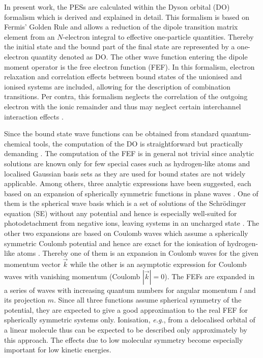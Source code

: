 In present work, the PESs are calculated within the Dyson orbital (DO) formalism which is derived and explained in detail.
This formalism is based on Fermis' Golden Rule \cite{fgr} and allows a reduction of the dipole transition matrix element from an $N$-electron integral to effective one-particle quantities. %
Thereby the initial state and the bound part of the final state are represented by a one-electron quantity denoted as DO.
The other wave function entering the dipole moment operator is the free electron function (FEF).
In this formalism, electron relaxation and correlation effects between bound states of the unionised and ionised systems are included, allowing for the description of combination transitions.
Per contra, this formalism neglects the correlation of the outgoing electron with the ionic remainder and thus may neglect certain interchannel interaction effects \cite{LiSonntag}.

Since the bound state wave functions can be obtained from standard quantum-chemical tools, the computation of the DO is straightforward but practically demanding \cite{MAgg}.
The computation of the FEF is in general not trivial since analytic solutions are known only for few special cases such as hydrogen-like atoms \cite{Lifschitz} and localised Gaussian basis sets as they are used for bound states are not widely applicable.
Among others, three analytic expressions have been suggested, each based on an expansion of spherically symmetric functions in plane waves \cite{ezDyson}.
One of them is the spherical wave basis which is a set of solutions of the Schr\"odinger equation (SE) without any potential and hence is especially well-suited for photodetachment from negative ions, leaving systems in an uncharged state \cite{ezDyson, DO_TDDFT}.
The other two expansions are based on Coulomb waves which assume a spherically symmetric Coulomb potential and hence are exact for the ionisation of hydrogen-like atoms \cite{Lifschitz}.
Thereby one of them is an expansion in Coulomb waves for the given momentum vector $\vec{k}$ while the other is an asymptotic expression for Coulomb waves with vanishing momentum (Coulomb $|\vec{k}|=0$).
The FEFs are expanded in a series of waves with increasing quantum numbers for angular momentum $l$ and its projection $m$.
Since all three functions assume spherical symmetry of the potential, they are expected to give a good approximation to the real FEF for spherically symmetric systems only.
Ionisation, \textit{e.g.}, from a delocalised orbital of a linear molecule thus can be expected to be described only approximately by this approach.
The effects due to low molecular symmetry become especially important for low kinetic energies.

